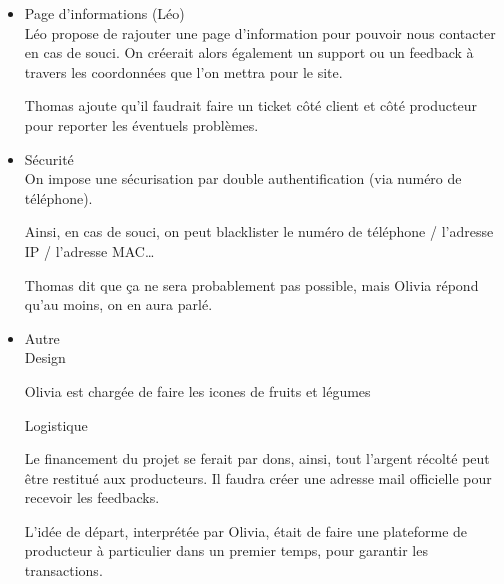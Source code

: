 \begin{description}
\begin{itemize}[label=\textbullet]
                \item Page d’informations (Léo)\\
                    Léo propose de rajouter une page d’information pour pouvoir nous contacter en cas de souci. On créerait alors également un support ou un feedback à travers les coordonnées que l’on mettra pour le site.
                    \par
                    Thomas ajoute qu’il faudrait faire un ticket côté client et côté producteur pour reporter les éventuels problèmes.
                
                \item Sécurité\\
                    On impose une sécurisation par double authentification (via numéro de téléphone).
                    \par
                    Ainsi, en cas de souci, on peut blacklister le numéro de téléphone / l’adresse IP / l’adresse MAC…
                    \par
                    Thomas dit que ça ne sera probablement pas possible, mais Olivia répond qu’au moins, on en aura parlé.
                    
                \item Autre\\
                Design
                \par
                Olivia est chargée de faire les icones de fruits et légumes
                \par
                Logistique
                \par
                Le financement du projet se ferait par dons, ainsi, tout l’argent récolté peut être restitué aux producteurs.
                Il faudra créer une adresse mail officielle pour recevoir les feedbacks.
                \par
                L’idée de départ, interprétée par Olivia, était de faire une plateforme de producteur à particulier dans un premier temps, pour garantir les transactions.



            \end{itemize}

        

    
    \end{description}

